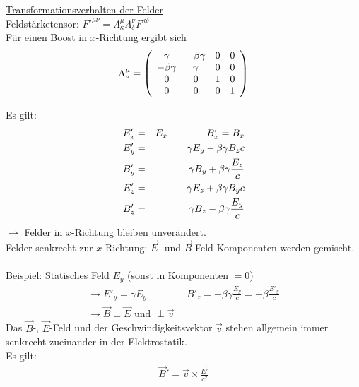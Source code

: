 




\underline{Transformationsverhalten der Felder}\\
Feldstärketensor: ${F'}^{\mu\nu} = \Lambda_{\kappa}^{\mu}\Lambda_{\delta}^{\nu}F^{\kappa \delta}$\\
Für einen Boost in $x$-Richtung ergibt sich 
\begin{eqnarray*} \Lambda_{\nu}^{\mu} = \left ( \begin{array}{cccc}
\gamma		& -\beta \gamma		&0	&0\\
-\beta\gamma	&\gamma			&0	&0\\
0		&0			&1	&0\\
0		&0			&0	&1 \end{array}\right)
\end{eqnarray*}
						
Es gilt:
\begin{eqnarray*}
E'_x &=& E_x \qquad \qquad B'_x = B_x\\
E'_y &=& \gamma E_y  - \beta\gamma B_z c\\
B'_y &=& \gamma B_y  +\beta\gamma \frac{E_z}c\\
E'_z &=& \gamma E_z  + \beta\gamma B_y c\\
B'_z &=& \gamma B_z  - \beta\gamma \frac{E_y}c
\end{eqnarray*}
$\longrightarrow$ Felder in $x$-Richtung bleiben unverändert.\\
Felder senkrecht zur $x$-Richtung: $\vec E$- und $\vec B$-Feld Komponenten werden gemischt.\\ \\
\underline{Beispiel:} Statisches Feld $E_y$ (sonst in Komponenten $=0$)\\
\begin{eqnarray*}
\rightarrow E'_y = \gamma E_y\qquad\qquad B'_z = -\beta\gamma\frac{E_y}c = -\beta \frac{E'_y}c\\
\rightarrow \vec B\perp\vec E \text{  und  } \perp \vec v
\end{eqnarray*}
Das $\vec B$-, $\vec E$-Feld und der Geschwindigkeitsvektor $\vec v$ stehen allgemein immer senkrecht zueinander in der Elektrostatik.\\ Es gilt:
\begin{eqnarray*} \vec B' = \vec v \times \frac{\vec E'}{c^2} \end{eqnarray*}


